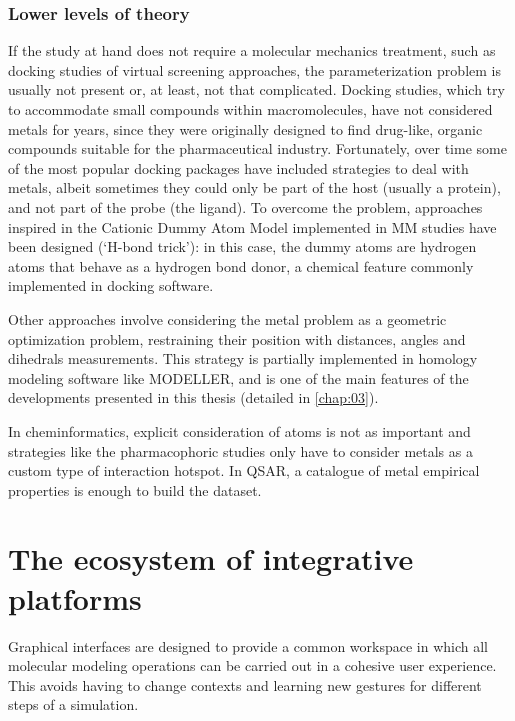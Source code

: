 \subsubsection{Lower levels of theory}
If the study at hand does not require a molecular mechanics treatment, such as docking studies of virtual screening approaches, the parameterization problem is usually not present or, at least, not that complicated. Docking studies, which try to accommodate small compounds within macromolecules, have not considered metals for years, since they were originally designed to find drug-like, organic compounds suitable for the pharmaceutical industry. Fortunately, over time some of the most popular docking packages have included strategies to deal with metals,\cite{flexx} albeit sometimes they could only be part of the host (usually a protein), and not part of the probe (the ligand).\cite{verdonk2003improved} To overcome the problem, approaches inspired in the Cationic Dummy Atom Model implemented in MM studies have been designed (‘H-bond trick’): in this case, the dummy atoms are hydrogen atoms that behave as a hydrogen bond donor, a chemical feature commonly implemented in docking software.

Other approaches involve considering the metal problem as a geometric optimization problem, restraining their position with distances, angles and dihedrals measurements. This strategy is partially implemented in homology modeling software like MODELLER, \cite{Sali1993} and is one of the main features of the developments presented in this thesis (detailed in \autoref{chap:03}).

In cheminformatics, explicit consideration of atoms is not as important and strategies like the pharmacophoric studies only have to consider metals as a custom type of interaction hotspot.\cite{johns2009,kawasuji2012,carcelli2014,yang2016} In QSAR, a catalogue of metal empirical properties is enough to build the dataset.\cite{walker2012fundamental}



\section{The ecosystem of integrative platforms}



Graphical interfaces are designed to provide a common workspace in which all molecular modeling operations can be carried out in a cohesive user experience. This avoids having to change contexts and learning new gestures for different steps of a simulation.

